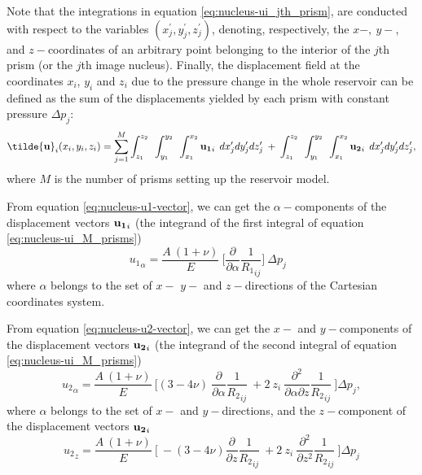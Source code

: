 \documentclass[journal abbreviation, manuscript]{copernicus}
\begin{document}
Note that the integrations in equation \ref{eq:nucleus-ui_jth_prism}, are conducted with respect to the variables $(x^{\prime}_{j}, y^{\prime}_{j}, z^{\prime}_{j})$, denoting, respectively, the
$x-, \: y-$, and $z-$coordinates of an arbitrary point belonging to the interior
of the $j$th prism (or the $j$th image nucleus).
Finally, the displacement field at the coordinates $x_i$, $y_i$  and $z_i$ due to the pressure change in the whole reservoir can be defined as the sum of the displacements yielded by each prism with constant pressure $\Delta p_{j}$:
\begin{equation}
{\bf{\tilde{u}}}_{i} (x_i,y_i,z_i) = \sum_{j=1}^{M} 
\int_{z_1}^{z_2} \:\:
\int_{y_1}^{y_2} \:\: 
\int_{x_1}^{x_2} 
{\bf{u_{1}}}_{i} \: \:  dx^{\prime}_j dy^{\prime}_j dz^{\prime}_j 
\: + \: 
\int_{z_1}^{z_2} \:\:
\int_{y_1}^{y_2} \:\: 
\int_{x_1}^{x_2} 
{\bf{u_{2}}}_{i} \:\:  dx^{\prime}_j dy^{\prime}_j dz^{\prime}_j, 
\label{eq:nucleus-ui_M_prisms}
\end{equation}
where $M$ is the number of prisms setting up the reservoir model.

From equation \ref{eq:nucleus-u1-vector},  we can get the   
$\alpha-$components of the displacement vectors ${\bf{u_{1}}}_{i}$  (the integrand of the first integral of equation \ref{eq:nucleus-ui_M_prisms})
\begin{equation}
{u_{1}}_\alpha =  \frac{A  \: (1 + \nu)}{E} \: \Bigg[  \frac{\partial }{\partial \alpha} {\frac{1}{{R_1}_{ij}}} \Bigg] \: \Delta p_{j} \:\:\:  
\label{eq:u1_alpha_component}
\end{equation}
where $\alpha$  belongs to the set of $ x-$ $y-$ and $z-$directions of the Cartesian coordinates system.

From equation  \ref{eq:nucleus-u2-vector}, we can get the $ x-$ and $y-$components of the displacement vectors ${\bf{u_{2}}}_{i}$  (the integrand of the second integral of equation \ref{eq:nucleus-ui_M_prisms})
\begin{equation}
{u_{2}}_\alpha =  \frac{A  \: (1 + \nu)}{E} \: \Bigg[ 
(3  - 4 \nu)    \: \frac{\partial }{\partial \alpha} {\frac{1}{{R_2}_{ij}}}\: 
+ 2 \: z_{i} \:  
\frac{\partial^{2}  }{\partial \alpha \partial z} {\frac{1}{{R_2}_{ij}}}  \: \Bigg]
\Delta p_{j} ,
\label{eq:u2_alpha_component}
\end{equation}
where  $\alpha$  belongs to the set of $ x-$ and $y-$directions, and the $z-$component of the displacement vectors ${\bf{u_{2}}}_{i}$  
\begin{equation}
{u_{2}}_z =  \frac{A  \: (1 + \nu)}{E} \: \Bigg[ 
\: - (3  - 4 \nu)  \frac{\partial }{\partial z} {\frac{1}{{R_2}_{ij}}}\: 
+ 2 \: z_{i} \:  
\frac{\partial^{2}  }{\partial z^{2}} {\frac{1}{{R_2}_{ij}}}  \: \Bigg]
\Delta p_{j}
\label{eq:u2_z_component}
\end{equation}
\end{document}
